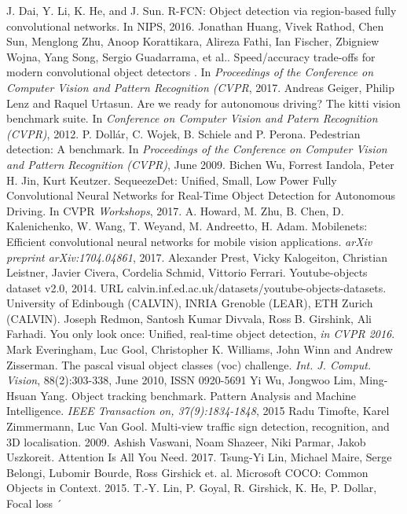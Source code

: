\documentclass[conference]{IEEEtran}
\begin{document}
\begin{thebibliography}{00}
 J. Dai, Y. Li, K. He, and J. Sun. R-FCN: Object detection via
region-based fully convolutional networks. In NIPS, 2016.
 Jonathan Huang, Vivek Rathod, Chen Sun, Menglong Zhu, Anoop Korattikara, Alireza Fathi, Ian Fischer, Zbigniew Wojna, Yang Song, Sergio Guadarrama, et al.. Speed/accuracy trade-offs for modern convolutional object detectors . In \textit{Proceedings of the Conference on Computer Vision and Pattern Recognition (CVPR}, 2017.
 Andreas Geiger, Philip Lenz and Raquel Urtasun. Are we ready for autonomous driving? The kitti vision benchmark suite. In \textit{Conference on Computer Vision and Patern Recognition (CVPR)}, 2012.
 P. Dollár, C. Wojek, B. Schiele and P. Perona. Pedestrian detection: A benchmark. In \textit{Proceedings of the Conference on Computer Vision and Pattern Recognition (CVPR)}, June 2009.
 Bichen Wu, Forrest Iandola, Peter H. Jin, Kurt Keutzer. SequeezeDet: Unified, Small, Low Power Fully Convolutional Neural Networks for Real-Time Object Detection for Autonomous Driving. In CVPR \textit{Workshops}, 2017.
 A. Howard, M. Zhu, B. Chen, D. Kalenichenko, W. Wang, T. Weyand, M. Andreetto, H. Adam. Mobilenets: Efficient convolutional neural networks for mobile vision applications. \textit{arXiv preprint arXiv:1704.04861}, 2017.
 Alexander Prest, Vicky Kalogeiton, Christian Leistner, Javier Civera, Cordelia Schmid, Vittorio Ferrari. Youtube-objects dataset v2.0, 2014. URL calvin.inf.ed.ac.uk/datasets/youtube-objects-datasets. University of Edinbough (CALVIN), INRIA Grenoble (LEAR), ETH Zurich (CALVIN). 
 Joseph Redmon, Santosh Kumar Divvala, Ross B. Girshink, Ali Farhadi. You only look once: Unified, real-time object detection, \textit{in CVPR 2016}.
 Mark Everingham, Luc Gool, Christopher K. Williams, John Winn and Andrew Zisserman. The pascal visual object classes (voc) challenge. \textit{Int. J. Comput. Vision}, 88(2):303-338, June 2010, ISSN 0920-5691
 Yi Wu, Jongwoo Lim, Ming-Hsuan Yang. Object tracking benchmark. Pattern Analysis and Machine Intelligence. \textit{IEEE Transaction on, 37(9):1834-1848}, 2015
 Radu Timofte, Karel Zimmermann, Luc Van Gool. Multi-view traffic sign detection, recognition, and 3D localisation. 2009.
 Ashish Vaswani, Noam Shazeer, Niki Parmar, Jakob Uszkoreit. Attention Is All You Need. 2017.
 Tsung-Yi Lin, Michael Maire, Serge Belongi, Lubomir Bourde, Ross Girshick et. al. Microsoft COCO: Common Objects in Context. 2015.
 T.-Y. Lin, P. Goyal, R. Girshick, K. He, P. Dollar, Focal loss ´

\end{thebibliography}
\end{document}
